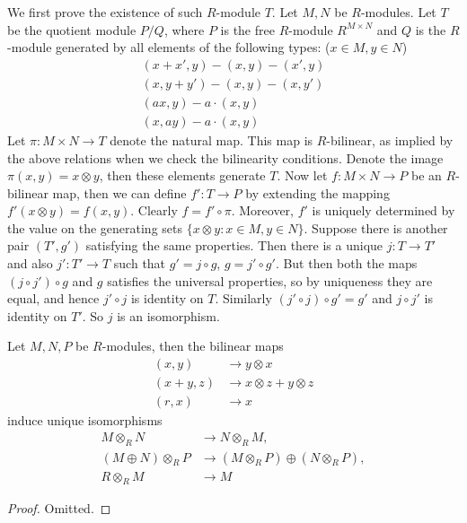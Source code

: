 \medskip\noindent
We first prove the existence of such $R$-module $T$.
Let $M, N$ be $R$-modules.
Let $T$ be the quotient module
$P/Q$, where $P$ is the free $R$-module $R^{M\times N}$ and $Q$ is the
$R$-module generated by all elements of
the following types: ($x\in M, y\in N$)
\begin{align}
(x + x', y)-(x, y)-(x', y)\\
(x, y + y')-(x, y)-(x, y')\\
(ax, y)-a\cdot(x, y)\\
(x, ay)-a\cdot(x, y)
\end{align}
Let $\pi : M\times N\rightarrow T$ denote the natural map.
This map is $R$-bilinear, as
implied by the above relations
when we check the bilinearity conditions. Denote the image
$\pi(x, y) = x\otimes
y$, then these elements generate
$T$. Now let $f : M\times N\rightarrow P$ be an $R$-bilinear map,
then we can define
$f' : T\rightarrow P$ by extending the mapping
$f'(x\otimes y) = f(x, y)$. Clearly $f = f'\circ \pi$. Moreover, $f'$ is
uniquely determined by the value on the
generating sets $\{x\otimes y : x\in M, y\in N\}$.
Suppose there is another pair $(T', g')$ satisfying the same properties.
Then there is a unique $j : T\rightarrow T'$ and
also $j' : T'\rightarrow T$ such that $g' = j\circ g$, $g = j'\circ g'$.
But then both the maps $(j\circ j') \circ g$ and $g$
satisfies the universal properties, so by uniqueness they are equal,
and hence $j'\circ j$ is identity on $T$.
Similarly $(j'\circ j) \circ g' = g'$ and $j\circ j'$ is identity on $T'$.
So $j$ is an isomorphism.

\begin{lemma}
\label{lemma-flip-tensor-product}
Let $M, N, P$ be $R$-modules, then the bilinear maps \\
\begin{align}
(x, y) &\rightarrow y\otimes x\\
(x + y, z) &\rightarrow x\otimes z + y\otimes z\\
(r, x) &\rightarrow x
\end{align}
induce unique isomorphisms
\begin{align}
M\otimes_R N &\rightarrow N\otimes_R M, \\
(M\oplus N)\otimes_R P &\rightarrow (M\otimes_R P)\oplus(N\otimes_R P),  \\
R\otimes_R M &\rightarrow M
\end{align}
\end{lemma}

\begin{proof}
Omitted.
\end{proof}

